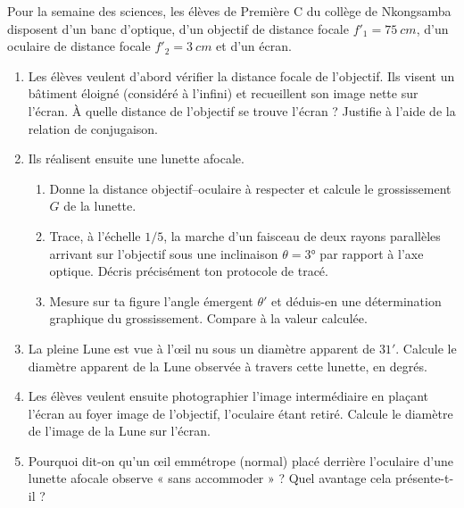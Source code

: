 \documentclass[11pt]{article}
\begin{document}
\begin{exercice}
Pour la semaine des sciences, les élèves de Première C du collège de Nkongsamba disposent d'un banc d'optique, d'un objectif de distance focale $f'_1 = \SI{75}{cm}$, d'un oculaire de distance focale $f'_2 = \SI{3}{cm}$ et d'un écran.
\begin{enumerate}
\item Les élèves veulent d'abord vérifier la distance focale de l'objectif. Ils visent un bâtiment éloigné (considéré à l'infini) et recueillent son image nette sur l'écran. À quelle distance de l'objectif se trouve l'écran ? Justifie à l'aide de la relation de conjugaison.
\item Ils réalisent ensuite une lunette afocale.
\begin{enumerate}
\item[a)] Donne la distance objectif--oculaire à respecter et calcule le grossissement $G$ de la lunette.
\item[b)] Trace, à l'échelle $1/5$, la marche d'un faisceau de deux rayons parallèles arrivant sur l'objectif sous une inclinaison $\theta = 3°$ par rapport à l'axe optique. Décris précisément ton protocole de tracé.
\item[c)] Mesure sur ta figure l'angle émergent $\theta'$ et déduis-en une détermination graphique du grossissement. Compare à la valeur calculée.
\end{enumerate}
\item La pleine Lune est vue à l'œil nu sous un diamètre apparent de $31'$. Calcule le diamètre apparent de la Lune observée à travers cette lunette, en degrés.
\item Les élèves veulent ensuite photographier l'image intermédiaire en plaçant l'écran au foyer image de l'objectif, l'oculaire étant retiré. Calcule le diamètre de l'image de la Lune sur l'écran.
\item Pourquoi dit-on qu'un œil emmétrope (normal) placé derrière l'oculaire d'une lunette afocale observe « sans accommoder » ? Quel avantage cela présente-t-il ?
\end{enumerate}
\end{exercice}
\end{document}
